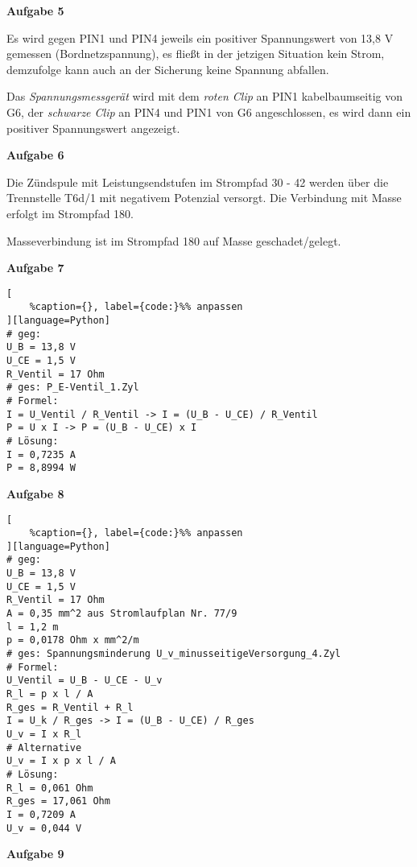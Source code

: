 \textbf{Aufgabe 5}

Es wird gegen PIN1 und PIN4 jeweils ein positiver Spannungswert von 13,8
V gemessen (Bordnetzspannung), es fließt in der jetzigen Situation kein
Strom, demzufolge kann auch an der Sicherung keine Spannung abfallen.

Das \emph{Spannungsmessgerät} wird mit dem \emph{roten Clip} an PIN1
kabelbaumseitig von G6, der \emph{schwarze Clip} an PIN4 und PIN1 von G6
angeschlossen, es wird dann ein positiver Spannungswert angezeigt.

\textbf{Aufgabe 6}

Die Zündspule mit Leistungsendstufen im Strompfad 30 - 42 werden über
die Trennstelle T6d/1 mit negativem Potenzial versorgt. Die Verbindung
mit Masse erfolgt im Strompfad 180.

Masseverbindung ist im Strompfad 180 auf Masse geschadet/gelegt.

\textbf{Aufgabe 7}

\lstset{language=Python}%
\begin{lstlisting}[
	%caption={}, label={code:}%% anpassen
][language=Python]
# geg:
U_B = 13,8 V
U_CE = 1,5 V
R_Ventil = 17 Ohm
# ges: P_E-Ventil_1.Zyl
# Formel:
I = U_Ventil / R_Ventil -> I = (U_B - U_CE) / R_Ventil
P = U x I -> P = (U_B - U_CE) x I
# Lösung:
I = 0,7235 A
P = 8,8994 W
\end{lstlisting}

\textbf{Aufgabe 8}

\lstset{language=Python}%
\begin{lstlisting}[
	%caption={}, label={code:}%% anpassen
][language=Python]
# geg:
U_B = 13,8 V
U_CE = 1,5 V
R_Ventil = 17 Ohm
A = 0,35 mm^2 aus Stromlaufplan Nr. 77/9
l = 1,2 m
p = 0,0178 Ohm x mm^2/m
# ges: Spannungsminderung U_v_minusseitigeVersorgung_4.Zyl
# Formel:
U_Ventil = U_B - U_CE - U_v
R_l = p x l / A
R_ges = R_Ventil + R_l
I = U_k / R_ges -> I = (U_B - U_CE) / R_ges
U_v = I x R_l
# Alternative
U_v = I x p x l / A
# Lösung:
R_l = 0,061 Ohm
R_ges = 17,061 Ohm
I = 0,7209 A
U_v = 0,044 V
\end{lstlisting}

\textbf{Aufgabe 9}

